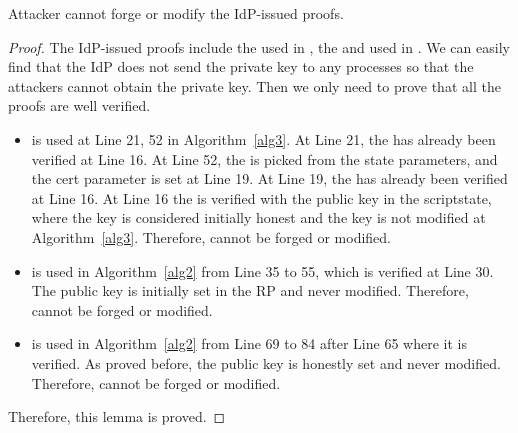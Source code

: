 \begin{relemma}
Attacker cannot forge or modify the IdP-issued proofs.
\label{rel:signature}
\end{relemma}
\begin{proof}
The IdP-issued proofs include the  used in , the  and  used in  . We can easily find that the IdP does not send the private key to any processes so that the attackers cannot obtain the private key. Then we only need to prove that all the proofs are well verified.
\begin{itemize}
\setlength\itemsep{-2pt}
\item {} is used at Line 21, 52 in Algorithm~\ref{alg3}. At Line 21, the  has already been verified at Line 16. At Line 52, the  is picked from the state parameters, and the cert parameter is set at Line 19.  At Line 19, the  has already been verified at Line 16.
At Line 16 the  is verified with the public key in the scriptstate, where the key is considered initially honest and the key is not modified at Algorithm~\ref{alg3}. Therefore,  cannot be forged or modified.
\item {} is used in Algorithm~\ref{alg2} from Line 35 to 55, which is verified at Line 30. The public key is initially set in the RP and never modified. Therefore,  cannot be forged or modified.
\item {} is used in Algorithm~\ref{alg2} from Line 69 to 84 after Line 65 where it is verified.  As proved before, the public key is honestly set and never modified. Therefore,  cannot be forged or modified.
\end{itemize}
Therefore, this lemma is proved.
\end{proof}

